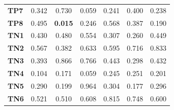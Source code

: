 \begin{table}
\begin{tabular}{lccc|ccc}
        \textbf{TP7}  & 0.342                                   & 0.730                                             & 0.059                                  & 0.241                                    & 0.400                                  & 0.238                                  \\
        \textbf{TP8}  & 0.495                                   & \cellcolor[HTML]{EFEFEF}\textbf{0.015}            & 0.246                                  & 0.568                                    & 0.387                                  & 0.190                                  \\
        \textbf{TN1}  & 0.430                                   & 0.480                                             & 0.554                                  & 0.307                                    & 0.260                                  & 0.449                                  \\
        \textbf{TN2}  & 0.567                                   & 0.382                                             & 0.633                                  & 0.595                                    & 0.716                                  & 0.833                                  \\
        \textbf{TN3}  & 0.393                                   & 0.866                                             & 0.766                                  & 0.443                                    & 0.298                                  & 0.432                                  \\
        \textbf{TN4}  & 0.104                                   & 0.171                                             & 0.059                                  & 0.245                                    & 0.251                                  & 0.201                                  \\
        \textbf{TN5}  & 0.290                                   & 0.199                                             & 0.964                                  & 0.304                                    & 0.177                                  & 0.296                                  \\
        \textbf{TN6}  & 0.521                                   & 0.510                                             & 0.608                                  & 0.815                                    & 0.748                                  & 0.600                                  \\

\end{tabular}
\end{table}
